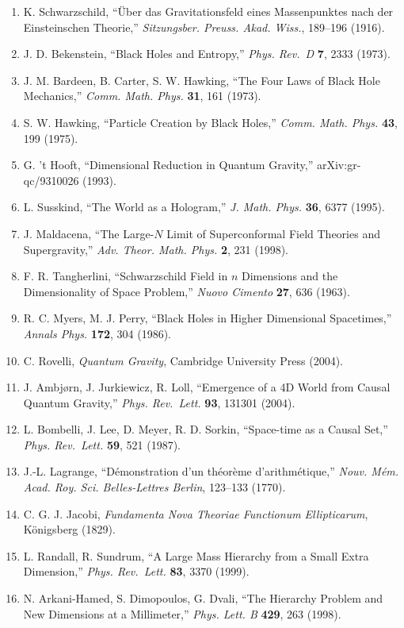 \documentclass[a4paper,11pt]{ltjsarticle}
\theoremstyle{definition}
\providecommand{\tightlist}{\setlength{\itemsep}{0pt}\setlength{\parskip}{0pt}}
\begin{document}
\begin{enumerate}
\def\labelenumi{\arabic{enumi}.}
\tightlist
\item
  K. Schwarzschild, ``Über das Gravitationsfeld eines Massenpunktes nach
  der Einsteinschen Theorie,'' \emph{Sitzungsber. Preuss. Akad. Wiss.},
  189--196 (1916).
\item
  J. D. Bekenstein, ``Black Holes and Entropy,'' \emph{Phys. Rev.~D}
  \textbf{7}, 2333 (1973).
\item
  J. M. Bardeen, B. Carter, S. W. Hawking, ``The Four Laws of Black Hole
  Mechanics,'' \emph{Comm. Math. Phys.} \textbf{31}, 161 (1973).
\item
  S. W. Hawking, ``Particle Creation by Black Holes,'' \emph{Comm. Math.
  Phys.} \textbf{43}, 199 (1975).
\item
  G. 't Hooft, ``Dimensional Reduction in Quantum Gravity,''
  arXiv:gr-qc/9310026 (1993).
\item
  L. Susskind, ``The World as a Hologram,'' \emph{J. Math. Phys.}
  \textbf{36}, 6377 (1995).
\item
  J. Maldacena, ``The Large-\(N\) Limit of Superconformal Field Theories
  and Supergravity,'' \emph{Adv. Theor. Math. Phys.} \textbf{2}, 231
  (1998).
\item
  F. R. Tangherlini, ``Schwarzschild Field in \(n\) Dimensions and the
  Dimensionality of Space Problem,'' \emph{Nuovo Cimento} \textbf{27},
  636 (1963).
\item
  R. C. Myers, M. J. Perry, ``Black Holes in Higher Dimensional
  Spacetimes,'' \emph{Annals Phys.} \textbf{172}, 304 (1986).
\item
  C. Rovelli, \emph{Quantum Gravity}, Cambridge University Press (2004).
\item
  J. Ambjørn, J. Jurkiewicz, R. Loll, ``Emergence of a 4D World from
  Causal Quantum Gravity,'' \emph{Phys. Rev.~Lett.} \textbf{93}, 131301
  (2004).
\item
  L. Bombelli, J. Lee, D. Meyer, R. D. Sorkin, ``Space-time as a Causal
  Set,'' \emph{Phys. Rev.~Lett.} \textbf{59}, 521 (1987).
\item
  J.-L. Lagrange, ``Démonstration d'un théorème d'arithmétique,''
  \emph{Nouv. Mém. Acad. Roy. Sci. Belles-Lettres Berlin}, 123--133
  (1770).
\item
  C. G. J. Jacobi, \emph{Fundamenta Nova Theoriae Functionum
  Ellipticarum}, Königsberg (1829).
\item
  L. Randall, R. Sundrum, ``A Large Mass Hierarchy from a Small Extra
  Dimension,'' \emph{Phys. Rev.~Lett.} \textbf{83}, 3370 (1999).
\item
  N. Arkani-Hamed, S. Dimopoulos, G. Dvali, ``The Hierarchy Problem and
  New Dimensions at a Millimeter,'' \emph{Phys. Lett. B} \textbf{429},
  263 (1998).
\end{enumerate}
\end{document}
